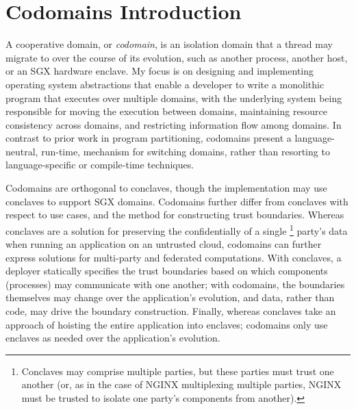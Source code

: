 \section{Codomains Introduction}
\label{sec:codomains-intro}

A cooperative domain, or \emph{codomain}, is an isolation domain
that a thread may migrate to over the course of its evolution, such as another
process, another host, or an SGX hardware enclave.
%
My focus is on designing and implementing operating system abstractions that
enable a developer to write a monolithic program that executes over multiple
domains, with the underlying system being responsible for moving the execution
between domains, maintaining resource consistency across domains, and
restricting information flow among domains.
%
In contrast to prior work in program partitioning, codomains present
a language-neutral, run-time, mechanism for switching domains, rather than
resorting to language-specific or compile-time techniques.



Codomains are orthogonal to conclaves, though the implementation may
use conclaves to support SGX domains.
%
Codomains further differ from conclaves with respect to use cases, and the
method for constructing trust boundaries.
%
Whereas conclaves are a solution for preserving the confidentially of a single
\footnote{
Conclaves may comprise
multiple parties, but these parties must trust one another (or, as in
the case of NGINX multiplexing multiple parties, NGINX must be trusted
to isolate one party's components from another).
}
party's data when running an application on an untrusted cloud,
%
codomains can further express solutions for multi-party and
federated computations.
%
With conclaves, a deployer statically specifies the trust boundaries based on
which components (processes) may communicate with one another;
%
%
with codomains, the boundaries themselves may change over
the application's evolution, and data, rather than code, may drive the boundary
construction.
%
Finally, whereas conclaves take an approach of hoisting the entire application
into enclaves; codomains only use enclaves as needed over the application's
evolution.







